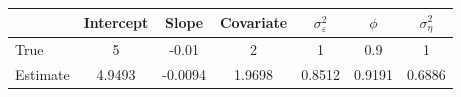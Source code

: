 \begin{tabular}{lcccccc}
\toprule
& Intercept & Slope & Covariate & $\sigma_\varepsilon^2$ & $\phi$ & $\sigma_\eta^2$ \\
\midrule
True & 5 & -0.01 & 2 & 1 & 0.9 & 1 \\
Estimate & 4.9493 & -0.0094 & 1.9698 & 0.8512 & 0.9191 & 0.6886 \\
\bottomrule
\end{tabular}
